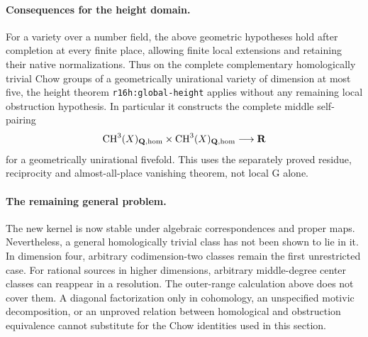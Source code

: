 \paragraph{Consequences for the height domain.}
For a variety over a number field, the above geometric hypotheses
hold after completion at every finite place, allowing finite local
extensions and retaining their native normalizations.  Thus on
the complete complementary homologically trivial Chow groups of
a geometrically unirational variety of dimension at most five,
the height theorem \texttt{r16h:global-height} applies without
any remaining local obstruction hypothesis.  In particular it
constructs the complete middle self-pairing
\[
 \operatorname{CH}^3(X)_{\mathbf Q,\rm hom}\times
 \operatorname{CH}^3(X)_{\mathbf Q,\rm hom}\longrightarrow\mathbf R
\]
for a geometrically unirational fivefold.  This uses the separately
proved residue, reciprocity and almost-all-place vanishing theorem,
not local G alone.

\paragraph{The remaining general problem.}
The new kernel is now stable under algebraic correspondences and
proper maps.  Nevertheless, a general homologically trivial class
has not been shown to lie in it.  In dimension four, arbitrary
codimension-two classes remain the first unrestricted case.
For rational sources in higher dimensions, arbitrary middle-degree
center classes can reappear in a resolution.  The outer-range
calculation above does not cover them.  A diagonal factorization
only in cohomology, an unspecified motivic decomposition, or an
unproved relation between homological and obstruction equivalence
cannot substitute for the Chow identities used in this section.
